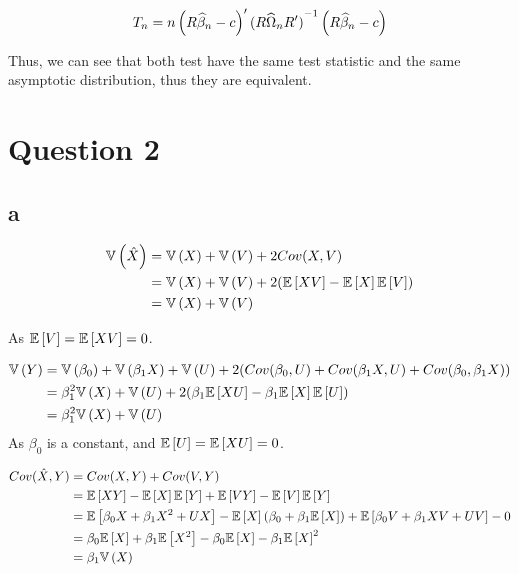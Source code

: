 \documentclass[12pt]{paper}
\begin{document}
\begin{equation*}
 T_n=n\left(  R \est{\beta} - c \right)'  \inv{(R\est{\Omega}R')}  \left(  R \est{\beta} - c \right)
\end{equation*}

Thus, we can see that both test have the same test statistic and the same asymptotic distribution, thus they are equivalent.

\section*{Question 2}

\subsection*{a}

\begin{align*}
  \Vari{\hat{X}} &= \Vari{X} + \Vari{V} + 2Cov( X, V)\\
                 &= \Vari{X} + \Vari{V} + 2(\exV{XV} - \exV{X}\exV{V})\\
                 &= \Vari{X} + \Vari{V}\\
\end{align*}

As $\exV{V} = \exV{XV} = 0$.

\begin{align*}
  \Vari{Y} &= \Vari{\beta_0} + \Vari{\beta_1 X} + \Vari{U} +2( Cov( \beta_0, U) +
             Cov( \beta_1 X, U) + Cov( \beta_0, \beta_1 X))\\
           &= \beta_1^2 \Vari{X} + \Vari{U} + 2(\beta_1 \exV{XU} - \beta_1 \exV{X} \exV{U})\\
  &= \beta_1^2 \Vari{X} + \Vari{U}\\
\end{align*}
As $\beta_0$ is a constant, and $\exV{U} = \exV{XU} = 0$.

\begin{align*}
  Cov( \hat{X}, Y) &= Cov( X, Y) + Cov( V, Y)\\
                   &= \exV{XY} - \exV{X}\exV{Y} + \exV{VY} - \exV{V}\exV{Y}\\
  &= \exV{\beta_0 X + \beta_1 X^2 + UX} - \exV{X}(\beta_0 + \beta_1 \exV{X}) + \exV{
    \beta_0 V + \beta_1 XV + UV} - 0\\
  &= \beta_0 \exV{X} + \beta_1 \exV{X^2} - \beta_0 \exV{X} - \beta_1 \exV{X}^2\\
  &= \beta_1 \Vari{X}
\end{align*}
\end{document}
